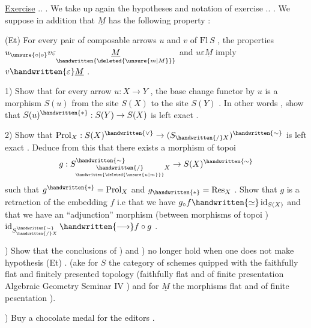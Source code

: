\uline{Exercise} .. . We take up again the hypotheses and notation of exercise .. . We suppose in addition that \(\underline{M}\) has the following property :

(Et) For every pair of composable arrows \(u\) and \(v\) of \(\mathrm{Fl}\ S\) , the  properties \(u_{\unsure{\circ|o}}v\varepsilon\underset{\handwritten{\deleted{\unsure{m|M}}}}{\underline{M}}\) and \(u\varepsilon\underline{M}\) imply \(v\handwritten{\varepsilon}\underline{M}\) .

1) Show that for every arrow \(u:X\to Y\) , the base change functor by \(u\) is a morphism  \(S(u)\) from the site \(S(X)\) to the site \(S(Y)\) . In other words , show that \(S(u)^{\handwritten{*}}:S(Y)\to S(X)\) is left exact .

2) Show that \(\operatorname{Prol}_X:S(X)^{\handwritten{\vee}}\to(S_{\handwritten{/}X})^{\handwritten{\sim}}\) is left exact . Deduce from this that there exists a morphism of topoi
\[
g:S^{\handwritten{\sim}}_{\underset{\handwritten{\deleted{\unsure{u|m}}}}{\handwritten{/}}X}\to S(X)^{\handwritten{\sim}}
\]
such that \(g^{\handwritten{*}}=\operatorname{Prol}_X\) and \(g_{\handwritten{*}}=\operatorname{Res}_X\) . Show that \(g\) is a retraction of the embedding \(f\) i.e that we have \(g_{\circ}f\handwritten{\simeq}\operatorname{id}_{S(X)}\) and that we have an ``adjunction'' morphism (between morphisms of topoi ) \(\operatorname{id}_{S^{\handwritten{\sim}}_{\handwritten{/}X}}\handwritten{\longrightarrow} f\circ g\) .

) Show that the conclusions of ) and ) no longer hold when one does not make hypothesis (Et) . (ake for \(S\) the category of schemes quipped with the faithfully flat and finitely presented topology (faithfully flat and of finite presentation \handwritten{[} Algebraic Geometry Seminar  IV \handwritten{]} ) and for \(\underline{M}\) the morphisms  flat and of finite pesentation ).

) Buy a chocolate medal for the editors .
